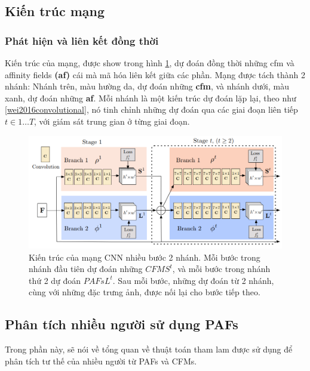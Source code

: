 \subsection{Kiến trúc mạng}
\label{sss:structure}
\subsubsection{Phát hiện và liên kết đồng thời}

Kiến trúc của mạng, được show trong hình \ref{fig:structure}, dự đoán đồng thời những cfm và affinity fields \textbf{(af)} cái mà mã hóa liên kết giữa các phần. Mạng được tách thành 2 nhánh: Nhánh trên, màu hường da, dự đoán những \textbf{cfm}, và nhánh dưới, màu xanh, dự đoán những \textbf{af}. Mỗi nhánh là một kiến trúc dự đoán lặp lại, theo như \ref{wei2016convolutional}, nó tinh chỉnh những dự đoán qua các giai đoạn liên tiếp $t \in {{1 \ldots T}}$,  với giám sát trung gian ở từng giai đoạn.

\FloatBarrier
\begin{figure}[htp]
\begin{center}
\includegraphics[scale=0.45]{chap3/c3_figs/structure.png}
\end{center}
\caption{Kiến trúc của mạng CNN nhiều bước 2 nhánh. Mỗi bước trong nhánh đầu tiên dự đoán những $CFM S^{t}$, và mỗi bước trong nhánh thứ 2 dự đoán $PAFs L^{t}$. Sau mỗi bước, những dự đoán từ 2 nhánh, cùng với những đặc trưng ảnh, được nối lại cho bước tiếp theo.}
\label{fig:structure}
\end{figure}
\FloatBarrier

\subsection{Phân tích nhiều người sử dụng PAFs}
\label{ss:Multi-Person Parsing using PAFs}

Trong phần này, sẽ nói về tổng quan về thuật toán tham lam được sử dụng để phân tích tư thế của nhiều người từ PAFs và CFMs.

